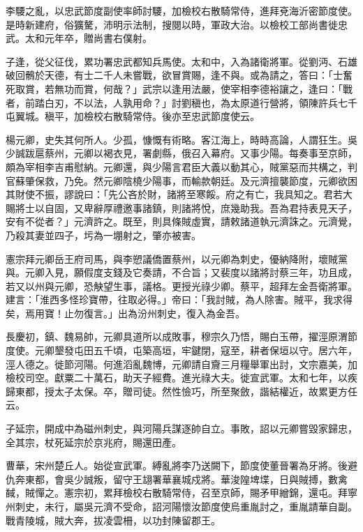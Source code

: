 \begin{pinyinscope}
 李騕之亂，以忠武節度副使率師討騕，加檢校右散騎常侍，進拜兗海沂密節度使。是時新建府，俗獷驁，沛明示法制，搜閱以時，軍政大治。以檢校工部尚書徙忠武。太和元年卒，贈尚書右僕射。



 子逢，從父征伐，累功署忠武都知兵馬使。太和中，入為諸衛將軍。從劉沔、石雄破回鶻於天德，有士二千人未嘗戰，欲冒賞賜，逢不與。或為請之，答曰：「士奮死取賞，若無功而賞，何哉？」武宗以逢用法嚴，使宰相李德裕讓之，逢曰：「戰者，前踏白刃，不以法，人孰用命？」討劉稹也，為太原道行營將，領陳許兵七千屯翼城。稹平，加檢校右散騎常侍。後亦至忠武節度使云。



 楊元卿，史失其何所人。少孤，慷慨有術略。客江海上，時時高論，人謂狂生。吳少誠跋扈蔡州，元卿以褐衣見，署劇縣，俄召入幕府。又事少陽。每奏事至京師，頗為宰相李吉甫慰納。元卿還，與少陽言君臣大義以動其心，賊黨惡而共構之，判官蘇肇保救，乃免。然元卿陰橈少陽事，而輸款朝廷。及元濟擅襲節度，元卿欲困其財使不振，謬說曰：「先公吝於財，諸將至寒餒。府之有亡，我具知之。君若大賜將士以自固，又卑辭厚禮邀事諸鎮，則諸將悅，庶幾助我。吾為君持表見天子，安有不從者？」元濟許之。既至，則具條賊虛實，請敕諸道執元濟誅之。元濟覺，乃殺其妻並四子，圬為一堋射之，肇亦被害。



 憲宗拜元卿岳王府司馬，與李愬議僑置蔡州，以元卿為刺史，優納降附，壞賊黨與。元卿入見，願假度支錢及它奏請，不合旨；又裴度以諸將討蔡三年，功且成，若又以州與元卿，恐觖望生事，議格。更授光祿少卿。蔡平，超拜左金吾衛將軍。建言：「淮西多怪珍寶帶，往取必得。」帝曰：「我討賊，為人除害。賊平，我求得矣，焉用寶！止勿復言。」出為汾州刺史，復入為金吾。



 長慶初，鎮、魏易帥，元卿具道所以成敗事，穆宗久乃悟，賜白玉帶，擢涇原渭節度使。元卿墾發屯田五千頃，屯築高垣，牢鍵閉，寇至，耕者保垣以守。居六年，涇人德之。徙節河陽。何進滔亂魏博，元卿請自齎三月糧舉軍出討，文宗嘉美，加檢校司空。獻粟二十萬石，助天子經費。進光祿大夫。徙宣武軍。太和七年，以疾歸東都，授太子太保。卒，贈司徒。然性憸巧，所至聚斂，諧結權近，故累更方任云。



 子延宗，開成中為磁州刺史，與河陽兵謀逐帥自立。事敗，詔以元卿嘗毀家歸忠，全其宗，杖死延宗於京兆府，賜還田產。



 曹華，宋州楚丘人。始從宣武軍。縛亂將李乃送闕下，節度使董晉署為牙將。後避仇奔東都，會吳少誠叛，留守王翃署華襄城戍將。華浚隍埤堞，日與賊搏，數禽馘，賊憚之。憲宗初，累拜檢校右散騎常侍，召至京師，賜矛甲繒錦，還屯。拜寧州刺史，未行，屬吳元濟不受命，詔河陽懷汝節度使烏重胤討之，重胤請華自副。戰青陵城，賊大奔，拔凌雲柵，以功封陳留郡王。




\end{pinyinscope}

